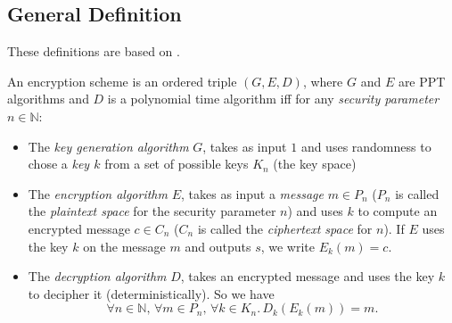 \subsection{General Definition}
These definitions are based on \cite{PuMaC2016}.

\begin{definition}
 An encryption scheme is an ordered triple $(G, E, D)$, where $G$ and $E$ are PPT algorithms and $D$ is a polynomial time algorithm iff for any \emph{security parameter} $n\in\mathbb{N}$:
 \begin{itemize}
  \item The \emph{key generation algorithm} $G$, takes as input $1$ and uses randomness to chose a \emph{key $k$} from a set of possible keys $K_n$ (the key space)
  \item The \emph{encryption algorithm} $E$, takes as input a \emph{message} $m\in P_n$ ($P_n$ is called the \emph{plaintext space} for the security parameter $n$) and uses $k$ to compute an encrypted message $c\in C_n$ ($C_n$ is called the \emph{ciphertext space} for $n$). If $E$ uses the key $k$ on the message $m$ and outputs $s$, we write $E_k(m)=c$.
  \item The \emph{decryption algorithm} $D$, takes an encrypted message and uses the key $k$ to decipher it (deterministically). So we have $$\forall n\in\mathbb{N},\,\forall m\in P_n,\,\forall k \in K_n.\,D_k(E_k(m))=m.$$
 \end{itemize}
\end{definition}

